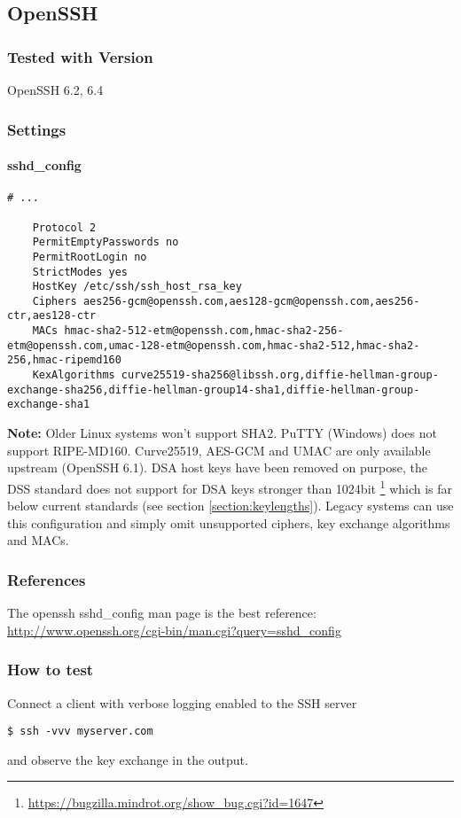 \subsection{OpenSSH}
\subsubsection{Tested with Version} OpenSSH 6.2, 6.4
\subsubsection{Settings}
\paragraph*{sshd\_config}
\begin{lstlisting}[breaklines]
	# ...

	Protocol 2
	PermitEmptyPasswords no
	PermitRootLogin no
	StrictModes yes
	HostKey /etc/ssh/ssh_host_rsa_key
	Ciphers aes256-gcm@openssh.com,aes128-gcm@openssh.com,aes256-ctr,aes128-ctr
	MACs hmac-sha2-512-etm@openssh.com,hmac-sha2-256-etm@openssh.com,umac-128-etm@openssh.com,hmac-sha2-512,hmac-sha2-256,hmac-ripemd160
	KexAlgorithms curve25519-sha256@libssh.org,diffie-hellman-group-exchange-sha256,diffie-hellman-group14-sha1,diffie-hellman-group-exchange-sha1
\end{lstlisting}

\textbf{Note:} Older Linux systems won't support SHA2. PuTTY (Windows) does not support
RIPE-MD160. Curve25519, AES-GCM and UMAC are only available upstream (OpenSSH
6.1). DSA host keys have been removed on purpose, the DSS standard does not
support for DSA keys stronger than 1024bit
\footnote{\url{https://bugzilla.mindrot.org/show_bug.cgi?id=1647}} which is far
below current standards (see section \ref{section:keylengths}). Legacy systems
can use this configuration and simply omit unsupported ciphers, key exchange
algorithms and MACs.  
\subsubsection{References}
The openssh sshd\_config  man page is the best reference: \url{http://www.openssh.org/cgi-bin/man.cgi?query=sshd_config}
\subsubsection{How to test}
Connect a client with verbose logging enabled to the SSH server \\
\begin{lstlisting}[breaklines]
$ ssh -vvv myserver.com
\end{lstlisting}and observe the key exchange in the output.


